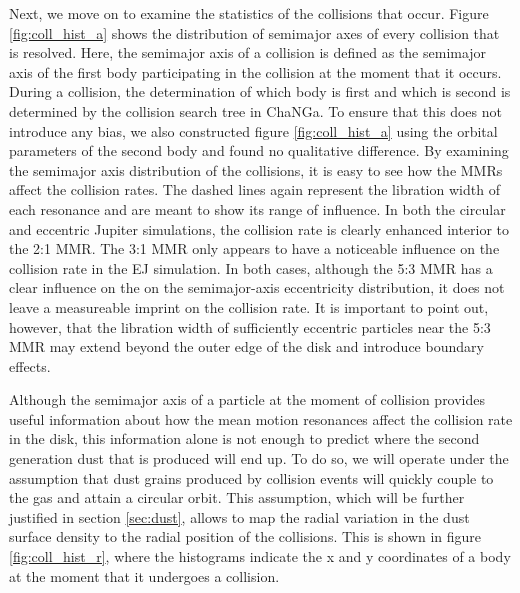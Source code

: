 \documentclass[twocolumn]{aastex63}
\begin{document}
Next, we move on to examine the statistics of the collisions that occur. Figure \ref{fig:coll_hist_a} shows the distribution of semimajor axes of every collision that is resolved. Here, the semimajor axis of a collision is defined as the semimajor axis of the first body participating in the collision at the moment that it occurs. During a collision, the determination of which body is first and which is second is determined by the collision search tree in {\sc ChaNGa}. To ensure that this does not introduce any bias, we also constructed figure \ref{fig:coll_hist_a} using the orbital parameters of the second body and found no qualitative difference. By examining the semimajor axis distribution of the collisions, it is easy to see how the MMRs affect the collision rates. The dashed lines again represent the libration width of each resonance and are meant to show its range of influence. In both the circular and eccentric Jupiter simulations, the collision rate is clearly enhanced interior to the 2:1 MMR. The 3:1 MMR only appears to have a noticeable influence on the collision rate in the EJ simulation. In both cases, although the 5:3 MMR has a clear influence on the on the semimajor-axis eccentricity distribution, it does not leave a measureable imprint on the collision rate. It is important to point out, however, that the libration width of sufficiently eccentric particles near the 5:3 MMR may extend beyond the outer edge of the disk and introduce boundary effects.

Although the semimajor axis of a particle at the moment of collision provides useful information about how the mean motion resonances affect the collision rate in the disk, this information alone is not enough to predict where the second generation dust that is produced will end up. To do so, we will operate under the assumption that dust grains produced by collision events will quickly couple to the gas and attain a circular orbit. This assumption, which will be further justified in section \ref{sec:dust}, allows to map the radial variation in the dust surface density to the radial position of the collisions. This is shown in figure \ref{fig:coll_hist_r}, where the histograms indicate the x and y coordinates of a body at the moment that it undergoes a collision.
\end{document}

